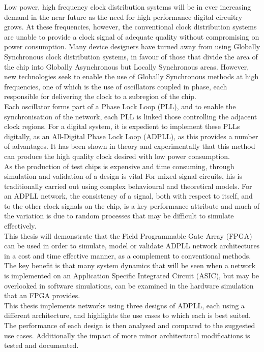\documentclass[11pt,english,british]{report}
\begin{document}
Low power, high frequency clock distribution systems will be in ever increasing demand in the near future as the need for high performance digital circuitry grows. At these frequencies, however, the conventional clock distribution systems are unable to provide a clock signal of adequate quality without compromising on power consumption. Many device designers have turned away from using Globally Synchronous clock distribution systems, in favour of those that divide the area of the chip into Globally Asynchronous but Locally Synchronous areas. However, new technologies seek to enable the use of Globally Synchronous methods at high frequencies, one of which is the use of oscillators coupled in phase, each responsible for delivering the clock to a subregion of the chip.\\
Each oscillator forms part of a Phase Lock Loop (PLL), and to enable the synchronisation of the network, each PLL is linked those controlling the adjacent clock regions. For a digital system, it is expedient to implement these PLLs digitally, as an All-Digital Phase Lock Loop (ADPLL), as this provides a number of advantages. It has been shown in theory and experimentally that this method can produce the high quality clock desired with low power consumption.\\
As the production of test chips is expensive and time consuming, through simulation and validation of a design is vital For mixed-signal circuits, his is traditionally carried out using complex behavioural and theoretical models. For an ADPLL network, the consistency of a signal, both with respect to itself, and to the other clock signals on the chip, is a key performance attribute and much of the variation is due to random processes that may be difficult to simulate effectively.\\
This thesis will demonstrate that the Field Programmable Gate Array (FPGA) can be used in order to simulate, model or validate ADPLL network architectures in a cost and time effective manner, as a complement to conventional methods. The key benefit is that many system dynamics that will be seen when a network is implemented on an Application Specific Integrated Circuit (ASIC), but may be overlooked in software simulations, can be examined in the hardware simulation that an FPGA provides.\\
This thesis implements networks using three designs of ADPLL, each using a different architecture, and highlights the use cases to which each is best suited. The performance of each design is then analysed and compared to the suggested use cases. Additionally the impact of more minor architectural modifications is tested and documented.
\end{document}
